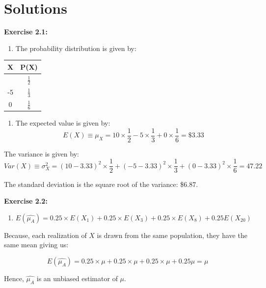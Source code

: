 \documentclass[
]{book}
\providecommand{\tightlist}{%
  \setlength{\itemsep}{0pt}\setlength{\parskip}{0pt}}
\theoremstyle{definition}
\theoremstyle{definition}
\theoremstyle{definition}
\theoremstyle{definition}
\theoremstyle{remark}
\begin{document}
\hypertarget{solutions-7}{%
\section*{Solutions}\label{solutions-7}}

\textbf{Exercise 2.1:}

\begin{enumerate}
\def\labelenumi{\alph{enumi}.}
\tightlist
\item
  The probability distribution is given by:
\end{enumerate}

\begin{longtable}[]{@{}cc@{}}
\toprule\noalign{}
X & P(X) \\
\midrule\noalign{}
\endhead
\bottomrule\noalign{}
\endlastfoot
10 & \(\displaystyle \frac{1}{2}\) \\
-5 & \(\displaystyle \frac{1}{3}\) \\
0 & \(\displaystyle \frac{1}{6}\) \\
\end{longtable}

\begin{enumerate}
\def\labelenumi{\alph{enumi}.}
\setcounter{enumi}{1}
\tightlist
\item
  The expected value is given by:
  \[E(X)\equiv\mu_X= 10 \times \frac{1}{2}-5 \times \frac{1}{3} +0 \times \frac{1}{6}=\$3.33\]
\end{enumerate}

The variance is given by:
\[Var(X)\equiv\sigma^2_X= (10-3.33)^2 \times \frac{1}{2}+(-5-3.33)^2 \times \frac{1}{3} +(0 -3.33)^2\times \frac{1}{6}=47.22\]

The standard deviation is the square root of the variance: \$6.87.

\textbf{Exercise 2.2:}

\begin{enumerate}
\def\labelenumi{\alph{enumi}.}
\tightlist
\item
  \[E(\widehat{\mu_A})=0.25\times E(X_1) +0.25\times E(X_3)+ 0.25 \times E(X_8) + 0.25 E(X_{20})\]
\end{enumerate}

Because, each realization of \(X\) is drawn from the same population, they have the same mean giving us:

\[E(\widehat{\mu_A})=0.25\times \mu +0.25\times \mu+ 0.25 \times \mu + 0.25 \mu=\mu\]

Hence, \(\widehat{\mu_A}\) is an unbiased estimator of \(\mu\).
\end{document}
